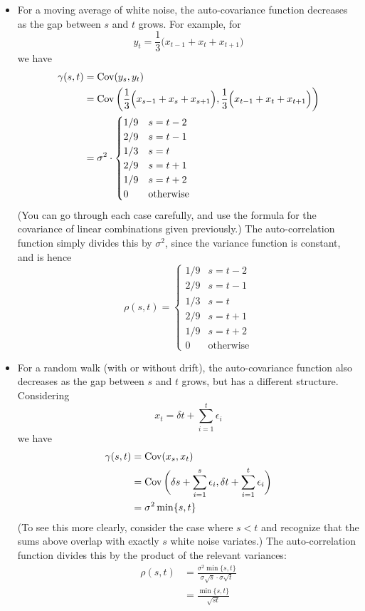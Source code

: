\documentclass{article}
\begin{document}
\begin{itemize}
\item For a moving average of white noise, the auto-covariance function
  decreases as the gap between $s$ and $t$ grows. For example, for  
  \[
  y_t = \frac{1}{3} \Big( x_{t-1} + x_t + x_{t+1} \Big)
  \]
  we have
  \begin{align*}
  \gamma(s,t) &= \operatorname{Cov}(y_s, y_t) \\
  &= \operatorname{Cov} \bigg( \frac{1}{3} \Big( x_{s-1} + x_s + x_{s+1} \Big), 
    \frac{1}{3} \Big( x_{t-1} + x_t + x_{t+1} \Big) \bigg) \\
  &=  \sigma^2 \cdot 
  \begin{cases}
  1 / 9 & s = t-2 \\
  2 / 9 & s = t-1 \\
  1 / 3 & s = t \\
  2 / 9 & s = t+1 \\
  1 / 9 & s = t+2 \\
  0 & \text{otherwise}
  \end{cases}
  \end{align*}
  (You can go through each case carefully, and use the formula for the
  covariance of linear combinations given previously.) The auto-correlation
  function simply divides this by $\sigma^2$, since the variance function is 
  constant, and is hence
  \[
  \rho(s,t) = 
  \begin{cases}
  1 / 9 & s = t-2 \\
  2 / 9 & s = t-1 \\
  1 / 3 & s = t \\
  2 / 9 & s = t+1 \\
  1 / 9 & s = t+2 \\
  0 & \text{otherwise}
  \end{cases}
  \]

\item For a random walk (with or without drift), the auto-covariance function
  also decreases as the gap between $s$ and $t$ grows, but has a different 
  structure. Considering 
  \[
  x_t = \delta t + \sum_{i=1}^t \epsilon_i
  \]
  we have
  \begin{align*}
  \gamma(s,t) &= \operatorname{Cov}(x_s, x_t) \\
  &= \operatorname{Cov} \bigg( \delta s + \sum_{i=1}^s \epsilon_i, 
  \delta t + \sum_{i=1}^t \epsilon_i \bigg) \\
  &= \sigma^2 \min\{s, t\}
  \end{align*}
  (To see this more clearly, consider the case where $s<t$ and recognize that 
  the sums above overlap with exactly $s$ white noise variates.) The
  auto-correlation function divides this by the product of the relevant
  variances: 
  \begin{align*}
  \rho(s,t) &= \frac{\sigma^2 \min\{s, t\}}{\sigma \sqrt{s} \cdot \sigma 
              \sqrt{t}} \\  
  &= \frac{\min\{s, t\}}{\sqrt{st}}
  \end{align*}


\end{itemize}
\end{document}
